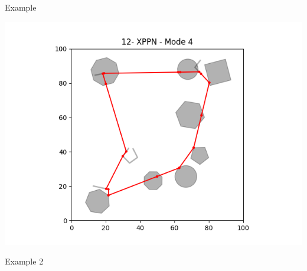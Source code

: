 \documentclass[slidestop,usepdftitle=false,10pt]{beamer}
\begin{document}
	\begin{frame}{Example}
	
	\includegraphics[width=1\linewidth]{example_xppn.png}
	    
	\end{frame}
	
	\begin{frame}{Example 2}
		
		\begin{center}
		\end{center}
	    
	\end{frame}
	
\end{document}
